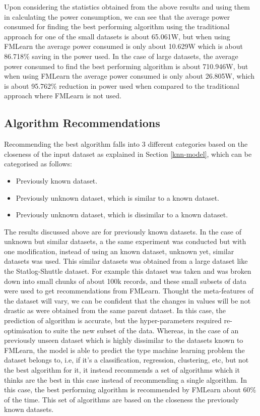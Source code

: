 Upon considering the statistics obtained from the above results and using them in calculating the power consumption, we can see that the average power consumed for finding the best performing algorithm using the traditional approach for one of the small datasets is about 65.061W, but when using FMLearn the average power consumed is only about 10.629W which is about 86.718\% saving in the power used. In the case of large datasets, the average power consumed to find the best performing algorithm is about 710.946W, but when using FMLearn the average power consumed is only about 26.805W, which is about 95.762\% reduction in power used when compared to the traditional approach where FMLearn is not used.

\subsection*{Algorithm Recommendations}

Recommending the best algorithm falls into 3 different categories based on the closeness of the input dataset as explained in Section \ref{knn-model}, which can be categorised as follows:
\begin{itemize}
    \item Previously known dataset.
    \item Previously unknown dataset, which is similar to a known dataset.
    \item Previously unknown dataset, which is dissimilar to a known dataset.
\end{itemize}

The results discussed above are for previously known datasets. In the case of unknown but similar datasets, a the same experiment was conducted but with one modification, instead of using an known dataset, unknown yet, similar datasets was used. This similar datasets was obtained from a large dataset like the Statlog-Shuttle dataset. For example this dataset was taken and was broken down into small chunks of about 100k records, and these small subsets of data were used to get recommendations from FMLearn. Thought the meta-features of the dataset will vary, we can be confident that the changes in values will be not drastic as were obtained from the same parent dataset. In this case, the prediction of algorithm is accurate, but the hyper-parameters required re-optimisation to suite the new subset of the data. Whereas, in the case of an previously unseen dataset which is highly dissimilar to the datasets known to FMLearn, the model is able to predict the type machine learning problem the dataset belongs to, i.e, if it's a classification, regression, clustering, etc, but not the best algorithm for it, it instead recommends a set of algorithms which it thinks are the best in this case instead of recommending a single algorithm. In this case, the best performing algorithm is recommended by FMLearn about 60\% of the time. This set of algorithms are based on the closeness the previously known datasets.